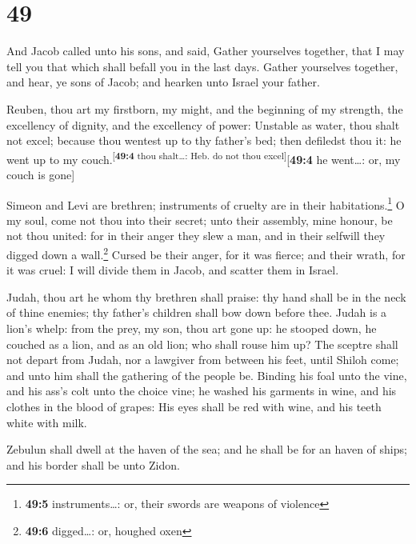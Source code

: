 \hypertarget{section-48}{%
\section{49}\label{section-48}}

 And Jacob called unto his sons, and said, Gather
yourselves together, that I may tell you that which shall befall you in
the last days.  Gather yourselves together, and hear, ye
sons of Jacob; and hearken unto Israel your father.

 Reuben, thou art my firstborn, my might, and the
beginning of my strength, the excellency of dignity, and the excellency
of power:  Unstable as water, thou shalt not excel;
because thou wentest up to thy father's bed; then defiledst thou it: he
went up to my couch.\textsuperscript{{[}\textbf{49:4} thou shalt\ldots:
Heb. do not thou excel{]}}{[}\textbf{49:4} he went\ldots: or, my couch
is gone{]}

 Simeon and Levi are brethren; instruments of cruelty are
in their habitations.\footnote{\textbf{49:5} instruments\ldots: or,
  their swords are weapons of violence}  O my soul, come
not thou into their secret; unto their assembly, mine honour, be not
thou united: for in their anger they slew a man, and in their selfwill
they digged down a wall.\footnote{\textbf{49:6} digged\ldots: or,
  houghed oxen}  Cursed be their anger, for it was fierce;
and their wrath, for it was cruel: I will divide them in Jacob, and
scatter them in Israel.

 Judah, thou art he whom thy brethren shall praise: thy
hand shall be in the neck of thine enemies; thy father's children shall
bow down before thee.  Judah is a lion's whelp: from the
prey, my son, thou art gone up: he stooped down, he couched as a lion,
and as an old lion; who shall rouse him up?  The sceptre
shall not depart from Judah, nor a lawgiver from between his feet, until
Shiloh come; and unto him shall the gathering of the people be.
 Binding his foal unto the vine, and his ass's colt unto
the choice vine; he washed his garments in wine, and his clothes in the
blood of grapes:  His eyes shall be red with wine, and
his teeth white with milk.

 Zebulun shall dwell at the haven of the sea; and he
shall be for an haven of ships; and his border shall be unto Zidon.

